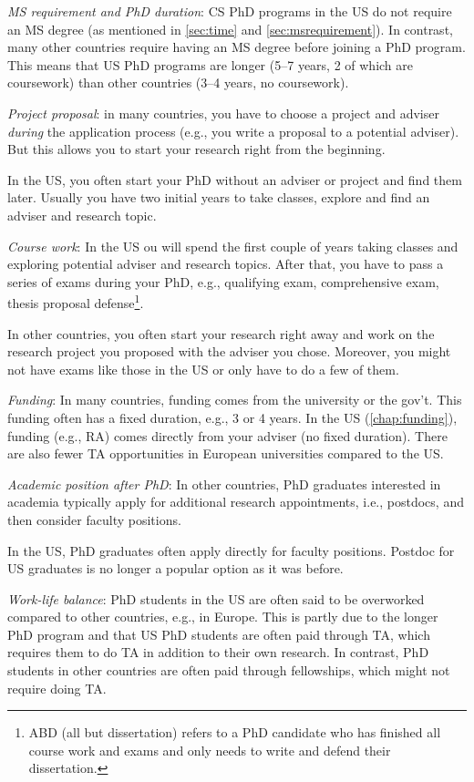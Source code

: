 \documentclass[oneside,11pt,dvipsnames]{book}
\begin{document}
\emph{MS requirement and PhD duration}:  CS PhD programs in the US do not require an MS degree (as mentioned in \autoref{sec:time} and \autoref{sec:msrequirement}).  In contrast, many other countries require having an MS degree before joining a PhD program.  This means that US PhD programs are longer (5--7 years, 2 of which are coursework) than other countries (3--4 years, no coursework).

\emph{Project proposal}: in many countries, you have to choose a project and adviser \emph{during} the application process (e.g., you write a proposal to a potential adviser). But this allows you to start your research right from the beginning. 

In the US, you often start your PhD without an adviser or project and find them later. Usually you have two initial years to take classes, explore and find an adviser and research topic. 

\emph{Course work}: In the US ou will spend the first couple of years taking classes and exploring potential adviser and research topics. 
After that, you have to pass a series of exams during your PhD, e.g., qualifying exam, comprehensive exam, thesis proposal defense\footnote{ABD (all but dissertation) refers to a PhD candidate who has finished all course work and exams and only needs to write and defend their dissertation.}.

In other countries, you often start your research right away and work on the research project you proposed with the adviser you chose. Moreover, you might not have exams like those in the US or only have to do a few of them.

\emph{Funding}:  In many countries, funding comes from the university or the gov't. This funding often has a fixed duration, e.g., 3 or 4 years.  In the US (\autoref{chap:funding}), funding (e.g., RA) comes directly from your adviser (no fixed duration).  There are also fewer TA opportunities in European universities compared to the US.

\emph{Academic position after PhD}: In other countries, PhD graduates interested in academia typically apply for additional research appointments, i.e., postdocs, and then consider faculty positions. 

In the US, PhD graduates often apply directly for faculty positions. Postdoc for US graduates is no longer a popular option as it was before.

\emph{Work-life balance}: PhD students in the US are often said to be overworked compared to other countries, e.g., in Europe.  This is partly due to the longer PhD program and that US PhD students are often paid through TA, which requires them to do TA in addition to their own research. In contrast, PhD students in other countries are often paid through fellowships, which might not require doing TA.
\end{document}
